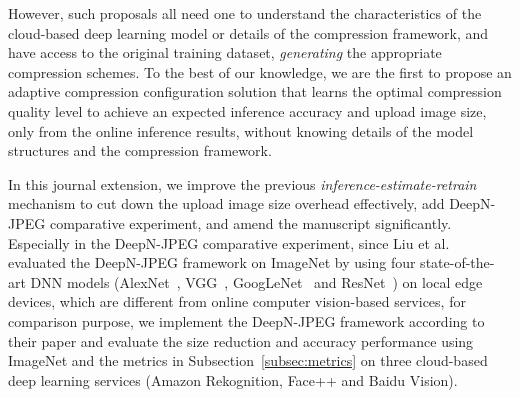 {\color{revise3}However, such proposals all need one to understand the characteristics of the cloud-based deep learning model or details of the compression framework, and have access to the original training dataset, \emph{generating} the appropriate compression schemes. To the best of our knowledge, we are the first to propose an adaptive compression configuration solution that learns the optimal compression quality level to achieve an expected inference accuracy and upload image size, only from the online inference results, without knowing details of the model structures and the compression framework.} 

In this journal extension, we improve the previous \emph{inference-estimate-retrain} mechanism to cut down the upload image size overhead effectively, add DeepN-JPEG comparative experiment, and amend the manuscript significantly. Especially in the DeepN-JPEG comparative experiment, since Liu et al.~\cite{DeepN-JPEG} evaluated the DeepN-JPEG framework on ImageNet by using four state-of-the-art DNN models (AlexNet~\cite{AlexNet-krizhevsky2012imagenet}, VGG~\cite{VGG-simonyan2014very}, GoogLeNet~\cite{GoogleNet-szegedy2015going} and ResNet~\cite{ResNet-he2016deep}) on local edge devices, which are different from online computer vision-based services, for comparison purpose, we implement the DeepN-JPEG framework according to their paper and evaluate the size reduction and accuracy performance using ImageNet and the metrics in Subsection~\ref{subsec:metrics} on three cloud-based deep learning services (Amazon Rekognition, Face++ and Baidu Vision).
